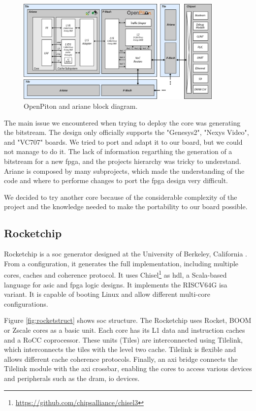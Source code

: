 \begin{figure}[h]
    \centering
    \includegraphics[width=0.9\textwidth]{images/openpiton_ariane_blockdiag.png}
    \caption{OpenPiton and ariane block diagram.}
    \label{fig:openpitonariane}
\end{figure}

The main issue we encountered when trying to deploy the core was generating the bitstream. The design only officially supports the "Genesys2", "Nexys Video", and "VC707" boards. We tried to port and adapt it to our board, but we could not manage to do it. 
The lack of information regarthing the generation of a bitstream for a new \gls{fpga}, and the projects hierarchy was tricky to understand.
Ariane is composed by many subprojects, which made the understanding of the code and where to performe changes to port the \gls{fpga} design very difficult.

We decided to try another core because of the considerable complexity of the project and the knowledge needed to make the portability to our board possible.

\subsection{Rocketchip}
Rocketchip is a \gls{soc} generator designed at the University of Berkeley, California \cite{rocket}. From a configuration, it generates the full implementation, including multiple cores, caches and coherence protocol. It uses Chisel\footnote{\url{https://github.com/chipsalliance/chisel3}} as \gls{hdl}, a Scala-based language for \gls{asic} and \gls{fpga} logic designs. It implements the RISCV64G \gls{isa} variant. It is capable of booting Linux and allow different multi-core configurations.

Figure \ref{fig:rocketstruct} shows \gls{soc} structure. The Rocketchip uses Rocket, BOOM or Zscale cores as a basic unit. Each core has its L1 data and instruction caches and a RoCC coprocessor. These units (Tiles) are interconnected using Tilelink, which interconnects the tiles with the level two cache. Tilelink is flexible and allows different cache coherence protocols. Finally, an \gls{axi} bridge connects the Tilelink module with the \gls{axi} crossbar, enabling the cores to access various devices and peripherals such as the \gls{dram}, \gls{io} devices.

